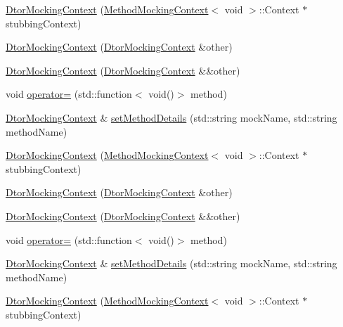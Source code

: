 \begin{DoxyCompactItemize}
\item 
\mbox{\hyperlink{classfakeit_1_1DtorMockingContext_a81c785463a44f396c4c3e5e0e1c9e40d}{Dtor\+Mocking\+Context}} (\mbox{\hyperlink{classfakeit_1_1MethodMockingContext}{Method\+Mocking\+Context}}$<$ void $>$\+::Context $\ast$stubbing\+Context)
\item 
\mbox{\hyperlink{classfakeit_1_1DtorMockingContext_a03939798c9836d082d94fe4e84d3dcd3}{Dtor\+Mocking\+Context}} (\mbox{\hyperlink{classfakeit_1_1DtorMockingContext}{Dtor\+Mocking\+Context}} \&other)
\item 
\mbox{\hyperlink{classfakeit_1_1DtorMockingContext_a0cf507524171b8ab2884f269a8a62a60}{Dtor\+Mocking\+Context}} (\mbox{\hyperlink{classfakeit_1_1DtorMockingContext}{Dtor\+Mocking\+Context}} \&\&other)
\item 
void \mbox{\hyperlink{classfakeit_1_1DtorMockingContext_ac65118e0817e56484fb2238d6c1b3f46}{operator=}} (std\+::function$<$ void()$>$ method)
\item 
\mbox{\hyperlink{classfakeit_1_1DtorMockingContext}{Dtor\+Mocking\+Context}} \& \mbox{\hyperlink{classfakeit_1_1DtorMockingContext_ac2e3a23d87a1f48613dd5bf73f457309}{set\+Method\+Details}} (std\+::string mock\+Name, std\+::string method\+Name)
\item 
\mbox{\hyperlink{classfakeit_1_1DtorMockingContext_a81c785463a44f396c4c3e5e0e1c9e40d}{Dtor\+Mocking\+Context}} (\mbox{\hyperlink{classfakeit_1_1MethodMockingContext}{Method\+Mocking\+Context}}$<$ void $>$\+::Context $\ast$stubbing\+Context)
\item 
\mbox{\hyperlink{classfakeit_1_1DtorMockingContext_a03939798c9836d082d94fe4e84d3dcd3}{Dtor\+Mocking\+Context}} (\mbox{\hyperlink{classfakeit_1_1DtorMockingContext}{Dtor\+Mocking\+Context}} \&other)
\item 
\mbox{\hyperlink{classfakeit_1_1DtorMockingContext_a0cf507524171b8ab2884f269a8a62a60}{Dtor\+Mocking\+Context}} (\mbox{\hyperlink{classfakeit_1_1DtorMockingContext}{Dtor\+Mocking\+Context}} \&\&other)
\item 
void \mbox{\hyperlink{classfakeit_1_1DtorMockingContext_ac65118e0817e56484fb2238d6c1b3f46}{operator=}} (std\+::function$<$ void()$>$ method)
\item 
\mbox{\hyperlink{classfakeit_1_1DtorMockingContext}{Dtor\+Mocking\+Context}} \& \mbox{\hyperlink{classfakeit_1_1DtorMockingContext_ac2e3a23d87a1f48613dd5bf73f457309}{set\+Method\+Details}} (std\+::string mock\+Name, std\+::string method\+Name)
\item 
\mbox{\hyperlink{classfakeit_1_1DtorMockingContext_a81c785463a44f396c4c3e5e0e1c9e40d}{Dtor\+Mocking\+Context}} (\mbox{\hyperlink{classfakeit_1_1MethodMockingContext}{Method\+Mocking\+Context}}$<$ void $>$\+::Context $\ast$stubbing\+Context)

\end{DoxyCompactItemize}

